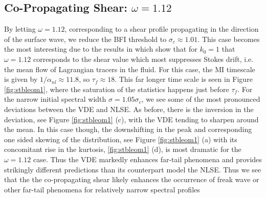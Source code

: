 \documentclass[a4paper,11pt]{article}
\begin{document}
\subsection*{Co-Propagating Shear: $\omega = 1.12$}

By letting $\omega=1.12$, corresponding to a shear profile propagating in the direction of the surface wave, we reduce the BFI threshold to $\sigma_{c} \approx 1.01$.  This case becomes the most interesting due to the results in \cite{curtis8} which show that for $k_{0}=1$ that $\omega=1.12$ corresponds to the shear value which most suppresses Stokes drift, i.e. the mean flow of Lagrangian tracers in the fluid.  For this case, the MI timescale is given by $1/\alpha_{nl}\approx 11.8$, so $\tau_{f}\approx 18$.  This far longer time scale is seen in Figure \ref{fig:stbleom1}, where the saturation of the statistics happens just before $\tau_{f}$.  For the narrow initial spectral width $\sigma = 1.05\sigma_{c}$, we see some of the most pronounced deviations between the VDE and NLSE.  As before, there is the inversion in the deviation, see Figure \ref{fig:stbleom1} (c), with the VDE tending to sharpen around the mean.  In this case though, the downshifting in the peak and corresponding one sided skewing of the distribution, see Figure \ref{fig:stbleom1} (a) with its concomitant rise in the kurtosis, \ref{fig:stbleom1} (d), is most dramatic for the $\omega=1.12$ case.  Thus the VDE markedly enhances far-tail phenomena and provides strikingly different predictions than its counterpart model the NLSE.  Thus we see that the the co-propagating shear likely enhances the occurrence of freak wave or other far-tail phenomena for relatively narrow spectral profiles
\end{document}
